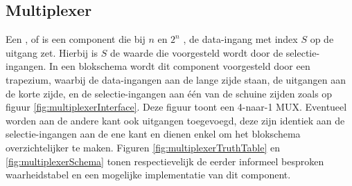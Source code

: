 \subsection{Multiplexer}
\label{ss:multiplexer}
Een ,  of  is een component die bij $n$  en $2^n$ , de data-ingang met index $S$ op de uitgang zet. Hierbij is $S$ de waarde die voorgesteld wordt door de selectie-ingangen. In een blokschema wordt dit component voorgesteld door een trapezium, waarbij de data-ingangen aan de lange zijde staan, de uitgangen aan de korte zijde, en de selectie-ingangen aan \'e\'en van de schuine zijden zoals op figuur \ref{fig:multiplexerInterface}. Deze figuur toont een 4-naar-1 MUX. Eventueel worden aan de andere kant ook uitgangen toegevoegd, deze zijn identiek aan de selectie-ingangen aan de ene kant en dienen enkel om het blokschema overzichtelijker te maken. Figuren \ref{fig:multiplexerTruthTable} en \ref{fig:multiplexerSchema} tonen respectievelijk de eerder informeel besproken waarheidstabel en een mogelijke implementatie van dit component.

